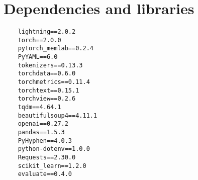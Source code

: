 \chapter{Dependencies and libraries}%
\label{app:dependances}

\begin{center}
    \begin{verbatim}
    lightning==2.0.2
    torch==2.0.0
    pytorch_memlab==0.2.4
    PyYAML==6.0
    tokenizers==0.13.3
    torchdata==0.6.0
    torchmetrics==0.11.4
    torchtext==0.15.1
    torchview==0.2.6
    tqdm==4.64.1
    beautifulsoup4==4.11.1
    openai==0.27.2
    pandas==1.5.3
    PyHyphen==4.0.3
    python-dotenv==1.0.0
    Requests==2.30.0
    scikit_learn==1.2.0
    evaluate==0.4.0
    \end{verbatim}
\end{center}